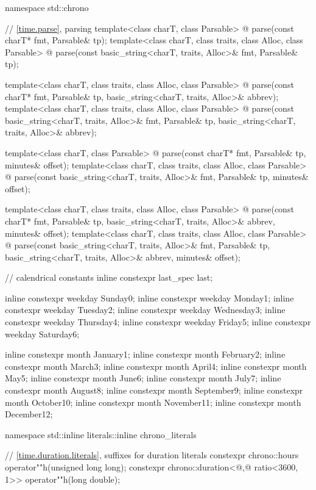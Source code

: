 \begin{codeblock}
namespace std::chrono {
  // \ref{time.parse}, parsing
  template<class charT, class Parsable>
    @\unspec@
      parse(const charT* fmt, Parsable& tp);
  template<class charT, class traits, class Alloc, class Parsable>
    @\unspec@
      parse(const basic_string<charT, traits, Alloc>& fmt, Parsable& tp);

  template<class charT, class traits, class Alloc, class Parsable>
    @\unspec@
      parse(const charT* fmt, Parsable& tp,
            basic_string<charT, traits, Alloc>& abbrev);
  template<class charT, class traits, class Alloc, class Parsable>
    @\unspec@
      parse(const basic_string<charT, traits, Alloc>& fmt, Parsable& tp,
            basic_string<charT, traits, Alloc>& abbrev);

  template<class charT, class Parsable>
    @\unspec@
      parse(const charT* fmt, Parsable& tp, minutes& offset);
  template<class charT, class traits, class Alloc, class Parsable>
    @\unspec@
      parse(const basic_string<charT, traits, Alloc>& fmt, Parsable& tp,
            minutes& offset);

  template<class charT, class traits, class Alloc, class Parsable>
    @\unspec@
      parse(const charT* fmt, Parsable& tp,
            basic_string<charT, traits, Alloc>& abbrev, minutes& offset);
  template<class charT, class traits, class Alloc, class Parsable>
    @\unspec@
      parse(const basic_string<charT, traits, Alloc>& fmt, Parsable& tp,
            basic_string<charT, traits, Alloc>& abbrev, minutes& offset);

  // calendrical constants
  inline constexpr last_spec last{};

  inline constexpr weekday Sunday{0};
  inline constexpr weekday Monday{1};
  inline constexpr weekday Tuesday{2};
  inline constexpr weekday Wednesday{3};
  inline constexpr weekday Thursday{4};
  inline constexpr weekday Friday{5};
  inline constexpr weekday Saturday{6};

  inline constexpr month January{1};
  inline constexpr month February{2};
  inline constexpr month March{3};
  inline constexpr month April{4};
  inline constexpr month May{5};
  inline constexpr month June{6};
  inline constexpr month July{7};
  inline constexpr month August{8};
  inline constexpr month September{9};
  inline constexpr month October{10};
  inline constexpr month November{11};
  inline constexpr month December{12};
}

namespace std::inline literals::inline chrono_literals {
  // \ref{time.duration.literals}, suffixes for duration literals
  constexpr chrono::hours                                 operator""h(unsigned long long);
  constexpr chrono::duration<@\unspec,@ ratio<3600, 1>> operator""h(long double);

}
\end{codeblock}
